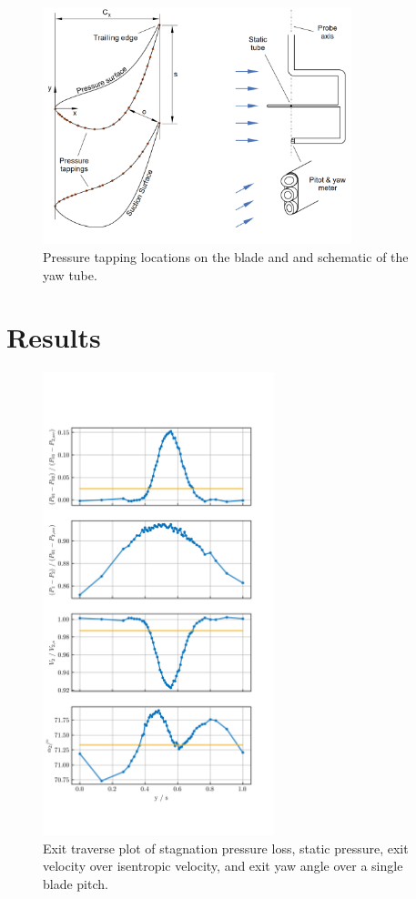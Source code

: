 \documentclass{article}
\begin{document}
\begin{figure}[H]
    \centering
    \includegraphics[width=0.8\textwidth]{figures/tappings_and_yawtube.png}
    \caption{Pressure tapping locations on the blade and and schematic of the yaw tube.}
    \label{fig:setup}
\end{figure}

\section{Results}

\begin{figure}[H]
    \centering
    \includegraphics[width=0.6\textwidth]{figures/wake_plot.png}
    \caption{Exit traverse plot of stagnation pressure loss, static pressure, exit velocity over isentropic velocity, and exit yaw angle over a single blade pitch.}
    \label{fig:wake_plot}
\end{figure}
\end{document}
